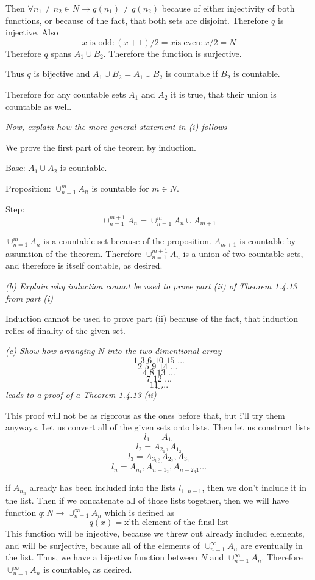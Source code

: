 \documentclass[11pt,oneside,titlepage]{book}
\begin{document}
Then $\forall n_1 \neq n_2 \in N \to g(n_1) \neq g(n_2)$ because of either
injectivity of both functions, or because of the fact, that both sets are
disjoint. Therefore $q$ is injective. Also
$${x \text{ is odd}: (x + 1) / 2} = {x \text{is even}: x/2 } = N$$
Therefore $q$ spans $A_1 \cup B_2$. Therefore the function is surjective.

Thus $q$ is bijective and $A_1 \cup B_2 = A_1 \cup B_2$ is countable if
$B_2$ is countable.

Therefore for any countable sets $A_1$ and $A_2$ it is true, that their
union is countable as well.

\textit{Now, explain how the more general statement in (i) follows}

We prove the first part of the teorem by induction.

Base: $A_1 \cup A_2$ is countable.

Proposition: $\cup^{m}_{n = 1}A_n$ is countable for $m \in N$.

Step:
$$\cup^{m + 1}_{n = 1}A_n = \cup^{m}_{n = 1}A_n \cup A_{m + 1}$$

$\cup^{m}_{n = 1}A_n$ is a countable set because of the proposition.
$A_{m + 1}$ is countable by assumtion of the theorem. Therefore
$\cup^{m + 1}_{n = 1}A_n$ is a union of two countable sets, and therefore is
itself contable, as desired.

\textit{(b) Explain why induction connot be used to prove part (ii) of
  Theorem 1.4.13 from part (i)}

Induction cannot be used to prove part (ii) because of the fact, that induction
relies of finality of the given set.

\textit{(c) Show how arranging N into the two-dimentional array }
$$\text{1 3 6 10 15 ...}$$
$$\text{2 5 9 14 ...   }$$
$$\text{4 8 13 ...}$$
$$\text{7 12 ...}$$
$$\text{11 ...}$$
$$...$$
\textit{leads to a proof of a Theorem 1.4.13 (ii)}

This proof will not be as rigorous as the ones before that, but i'll try them
anyways. Let us convert all of the given sets onto lists. Then let us construct
lists
$$l_1 = {A_{1_1}}$$
$$l_2 = {A_{2_1}, A_{1_2}}$$
$$l_3 = {A_{3_1}, A_{2_2}, A_{3_1}}$$
$$...$$
$$l_n = {A_{n_1}, A_{n - 1_{2}}, A_{n - 2_{3}1} ...}$$

if $A_{n_n}$ already has been included into the lists $l_{1..n - 1}$, then we don't
include it in the list.
Then if we concatenate all of those lists together, then we will have function
$q: N \to \cup^{\infty}_{n = 1} A_n$ which is defined as
$$q(x) = \text{x'th element of the final list}$$
This function will be injective, because we threw out already included elements, and
will be surjective, because all of the elements of $\cup^{\infty}_{n = 1} A_n$ are
eventually in the list. Thus, we have a bijective function between $N$ and
$\cup^{\infty}_{n = 1} A_n$. Therefore $\cup^{\infty}_{n = 1} A_n$ is countable, as
desired.
\end{document}
